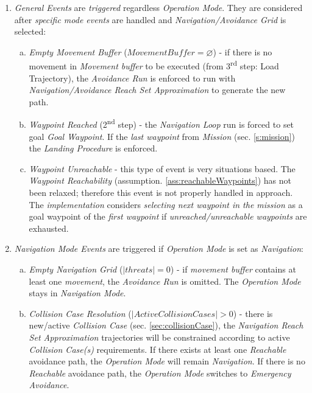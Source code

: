 \begin{enumerate}
    \item \emph{General Events} are \emph{triggered} regardless \emph{Operation Mode}. They are considered after \emph{specific mode events} are handled and \emph{Navigation/Avoidance Grid} is selected:
    \begin{enumerate}[a.]
        \item \emph{Empty Movement Buffer} ($Movement Buffer = \varnothing$) - if there is no movement in \emph{Movement buffer} to be executed (from 3\textsuperscript{rd} step: Load Trajectory), the \emph{Avoidance Run} is enforced to run with \emph{Navigation/Avoidance Reach Set Approximation} to generate the new path.
        
        \item \emph{Waypoint Reached} (2\textsuperscript{nd} step) - the \emph{Navigation Loop} run is forced to set goal \emph{Goal Waypoint}. If the \emph{last waypoint} from \emph{Mission} (sec. \ref{s:mission}) the \emph{Landing Procedure} is enforced.
        
        \item \emph{Waypoint Unreachable} - this type of event is very situations based. The \emph{Waypoint Reachability} (assumption. \ref{ass:reachableWaypoints}) has not been relaxed; therefore this event is not properly handled in approach. The \emph{implementation} considers \emph{selecting next waypoint in the mission} as a goal waypoint of the \emph{first waypoint} if \emph{unreached/unreachable waypoints} are exhausted. 
    \end{enumerate}
    
    \item \emph{Navigation Mode Events} are triggered if \emph{Operation Mode} is set as \emph{Navigation}:
    \begin{enumerate}[a.]
        \item \emph{Empty Navigation Grid} ($|threats| = 0$) - if \emph{movement buffer} contains at least one \emph{movement}, the \emph{Avoidance Run} is omitted. The \emph{Operation Mode} stays in \emph{Navigation Mode}.
        
        \item \emph{Collision Case Resolution} ($|ActiveCollisionCases| > 0$) - there is new/active \emph{Collision Case} (sec. \ref{sec:collisionCase}), the \emph{Navigation Reach Set Approximation} trajectories will be constrained according to  active \emph{Collision Case(s)} requirements. If there exists at least one \emph{Reachable} avoidance path, the \emph{Operation Mode} will remain \emph{Navigation}. If there is no  \emph{Reachable} avoidance path, the \emph{Operation Mode} switches to \emph{Emergency Avoidance}.
        

\end{enumerate}
\end{enumerate}
